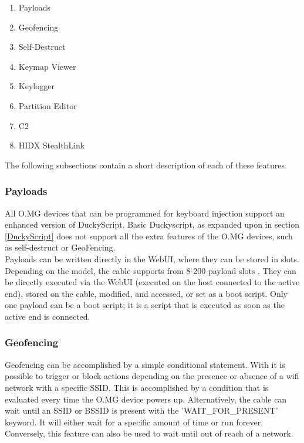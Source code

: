 \begin{enumerate}
    \item Payloads
    \item Geofencing
    \item Self-Destruct
    \item Keymap Viewer
    \item Keylogger
    \item Partition Editor
    \item C2
    \item HIDX StealthLink
\end{enumerate}

The following subsections contain a short description of each of these features. 

\subsubsection{Payloads}

All O.MG devices that can be programmed for keyboard injection support an enhanced version of DuckyScript. Basic Duckyscript, as expanded upon in section \ref{DuckyScript} does not support all the extra features of the O.MG devices, such as self-destruct or GeoFencing. \\
Payloads can be written directly in the WebUI, where they can be stored in slots. Depending on the model, the cable supports from 8-200 payload slots \cite{hak5MGCable}. They can be directly executed via the WebUI (executed on the host connected to the active end), stored on the cable, modified, and accessed, or set as a boot script. Only one payload can be a boot script; it is a script that is executed as soon as the active end is connected. \\



\subsubsection{Geofencing}

Geofencing can be accomplished by a simple conditional statement. With it is possible to trigger or block actions depending on the presence or absence of a wifi network with a specific SSID. This is accomplished by a condition that is evaluated every time the O.MG device powers up. Alternatively, the cable can wait until an SSID or BSSID is present with the 'WAIT\_FOR\_PRESENT' keyword.
It will either wait for a specific amount of time or run forever. Conversely, this feature can also be used to wait until out of reach of a network.

